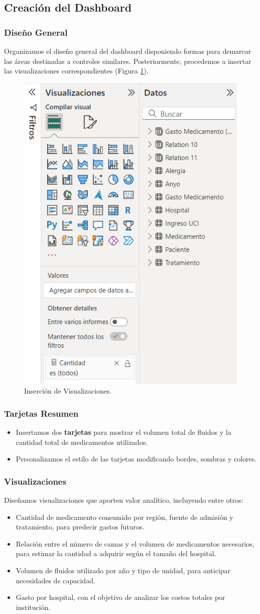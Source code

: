\documentclass{article}
\begin{document}
\subsection{Creación del Dashboard}

\subsubsection{Diseño General}
Organizamos el diseño general del dashboard disponiendo formas para demarcar las áreas destinadas a controles similares. Posteriormente, procedemos a insertar las visualizaciones correspondientes (Figura \ref{fig:visualizaciones}).

\begin{figure}[H]
	\centering
	\includegraphics[width=.4\textwidth]{images/graficas.png}
	\caption{Inserción de Visualizaciones.}
	\label{fig:visualizaciones}
\end{figure}

\subsubsection{Tarjetas Resumen}
\begin{itemize}
	\item Insertamos dos \textbf{tarjetas} para mostrar el volumen total de fluidos y la cantidad total de medicamentos utilizados.
	\item Personalizamos el estilo de las tarjetas modificando bordes, sombras y colores.
\end{itemize}

\subsubsection{Visualizaciones}
Diseñamos visualizaciones que aporten valor analítico, incluyendo entre otros:
\begin{itemize}
	\item Cantidad de medicamento consumido por región, fuente de admisión y tratamiento, para predecir gastos futuros.
	\item Relación entre el número de camas y el volumen de medicamentos necesarios, para estimar la cantidad a adquirir según el tamaño del hospital.
	\item Volumen de fluidos utilizado por año y tipo de unidad, para anticipar necesidades de capacidad.
	\item Gasto por hospital, con el objetivo de analizar los costos totales por institución.
\end{itemize}
\end{document}

